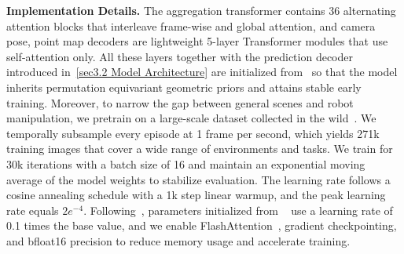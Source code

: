 \textbf{Implementation Details.}
The aggregation transformer contains 36 alternating attention blocks that interleave frame-wise and global attention, and camera pose, point map decoders are lightweight 5-layer Transformer modules that use self-attention only. 
All these layers together with the prediction decoder introduced in~\cref{sec3.2 Model Architecture} are initialized from~\cite{wang2025pi} so that the model inherits permutation equivariant geometric priors and attains stable early training. 
Moreover, to narrow the gap between general scenes and robot manipulation, we pretrain on a large-scale dataset collected in the wild~\cite{khazatsky2024droid}. We temporally subsample every episode at 1 frame per second, which yields 271k training images that cover a wide range of environments and tasks. 
We train for 30k iterations with a batch size of 16 and maintain an exponential moving average of the model weights to stabilize evaluation. 
The learning rate follows a cosine annealing schedule with a 1k step linear warmup, and the peak learning rate equals \(2e^{-4}\).
Following~\cite{jiang2025anysplat}, parameters initialized from ~\cite{wang2025pi} use a learning rate of 0.1 times the base value, and we enable FlashAttention~\cite{dao2022flashattention}, gradient checkpointing, and bfloat16 precision to reduce memory usage and accelerate training.
